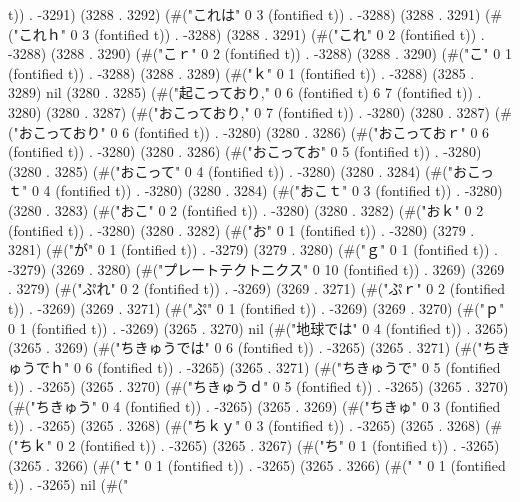 t)) . -3291) (3288 . 3292) (#("これは" 0 3 (fontified t)) . -3288) (3288 . 3291) (#("これｈ" 0 3 (fontified t)) . -3288) (3288 . 3291) (#("これ" 0 2 (fontified t)) . -3288) (3288 . 3290) (#("こｒ" 0 2 (fontified t)) . -3288) (3288 . 3290) (#("こ" 0 1 (fontified t)) . -3288) (3288 . 3289) (#("ｋ" 0 1 (fontified t)) . -3288) (3285 . 3289) nil (3280 . 3285) (#("起こっており," 0 6 (fontified t) 6 7 (fontified t)) . 3280) (3280 . 3287) (#("おこっており," 0 7 (fontified t)) . -3280) (3280 . 3287) (#("おこっており" 0 6 (fontified t)) . -3280) (3280 . 3286) (#("おこっておｒ" 0 6 (fontified t)) . -3280) (3280 . 3286) (#("おこってお" 0 5 (fontified t)) . -3280) (3280 . 3285) (#("おこって" 0 4 (fontified t)) . -3280) (3280 . 3284) (#("おこっｔ" 0 4 (fontified t)) . -3280) (3280 . 3284) (#("おこｔ" 0 3 (fontified t)) . -3280) (3280 . 3283) (#("おこ" 0 2 (fontified t)) . -3280) (3280 . 3282) (#("おｋ" 0 2 (fontified t)) . -3280) (3280 . 3282) (#("お" 0 1 (fontified t)) . -3280) (3279 . 3281) (#("が" 0 1 (fontified t)) . -3279) (3279 . 3280) (#("ｇ" 0 1 (fontified t)) . -3279) (3269 . 3280) (#("プレートテクトニクス" 0 10 (fontified t)) . 3269) (3269 . 3279) (#("ぷれ" 0 2 (fontified t)) . -3269) (3269 . 3271) (#("ぷｒ" 0 2 (fontified t)) . -3269) (3269 . 3271) (#("ぷ" 0 1 (fontified t)) . -3269) (3269 . 3270) (#("ｐ" 0 1 (fontified t)) . -3269) (3265 . 3270) nil (#("地球では" 0 4 (fontified t)) . 3265) (3265 . 3269) (#("ちきゅうでは" 0 6 (fontified t)) . -3265) (3265 . 3271) (#("ちきゅうでｈ" 0 6 (fontified t)) . -3265) (3265 . 3271) (#("ちきゅうで" 0 5 (fontified t)) . -3265) (3265 . 3270) (#("ちきゅうｄ" 0 5 (fontified t)) . -3265) (3265 . 3270) (#("ちきゅう" 0 4 (fontified t)) . -3265) (3265 . 3269) (#("ちきゅ" 0 3 (fontified t)) . -3265) (3265 . 3268) (#("ちｋｙ" 0 3 (fontified t)) . -3265) (3265 . 3268) (#("ちｋ" 0 2 (fontified t)) . -3265) (3265 . 3267) (#("ち" 0 1 (fontified t)) . -3265) (3265 . 3266) (#("ｔ" 0 1 (fontified t)) . -3265) (3265 . 3266) (#("
" 0 1 (fontified t)) . -3265) nil (#("
